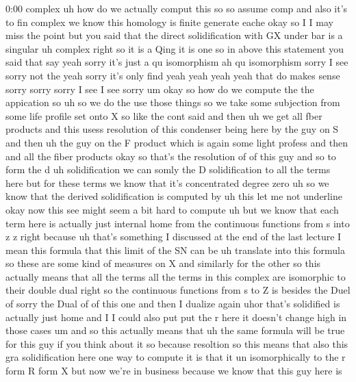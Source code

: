 \begin{unfinished}{0:00}
complex  uh  how  do  we  actually  comput
this  so  so  assume
comp  and  also  it's  to  fin  complex  we
know  this  homology  is
finite  generate  eache  okay
so  I  I  may  miss  the  point  but  you  said
that  the  direct  solidification  with  GX
under  bar  is  a  singular  uh  complex  right
so  it  is  a
Qing  it  is  one  so  in  above  this
statement  you  said  that  say  yeah  sorry
it's  just  a  qu  isomorphism  ah  qu
isomorphism  sorry  I  see  sorry  not  the
yeah  sorry  it's  only
find  yeah  yeah  yeah  yeah  that  do  makes
sense  sorry  sorry  sorry  I  see  I  see
sorry
um  okay  so  how  do  we  compute  the  the
appication  so  uh  so  we  do  the  use  those
things  so  we  take  some  subjection  from
some  life  profile  set  onto  X
so  like  the  cont
said  and
then  uh  we  get  all  fber  products  and
this  usess  resolution  of  this  condenser
being  here  by  the  guy  on  S  and
then  uh  the  guy  on  the  F
product  which  is  again  some  light
profess  and  then  and  all  the  fiber
products
okay  so  that's  the  resolution  of  of  this
guy  and  so  to  form  the  d  uh
solidification  we  can  somly  the  D
solidification  to  all  the  terms  here  but
for  these  terms  we  know  that  it's
concentrated  degree  zero  uh  so  we  know
that  the  derived
solidification  is
computed
by  uh  this
let  me  not
underline
okay  now  this  see  might  seem  a  bit  hard
to  compute  uh  but  we  know  that  each  term
here  is  actually  just  internal
home  from  the  continuous  functions  from
s  into  z  z
right  because  uh  that's  something  I
discussed  at  the  end  of  the  last  lecture
I  mean  this  formula  that  this  limit  of
the  SN  can  be  uh  translate  into  this
formula  so  these  are  some  kind  of
measures  on
X  and  similarly  for  the
other
so  this  actually  means  that  all  the
terms  all  the  terms  in  this  complex  are
isomorphic  to  their  double  dual  right  so
the  continuous  functions  from  s  to  Z  is
besides  the  Duel  of  sorry  the  Dual  of  of
this  one  and  then  I  dualize
again
uhor  that's  solidified  is  actually
just
home
and  I  I  could  also  put  put  the  r  here  it
doesn't  change  high  in  those  cases  um
and  so  this  actually  means  that  uh  the
same  formula  will  be  true  for  this  guy
if  you  think  about  it  so
because  resoltion  so  this  means  that
also  this  gra  solidification  here  one
way  to  compute  it  is  that  it  un
isomorphically  to  the  r
form  R
form
X
but  now  we're  in  business  because  we
know  that  this  guy  here  is

\end{unfinished}

